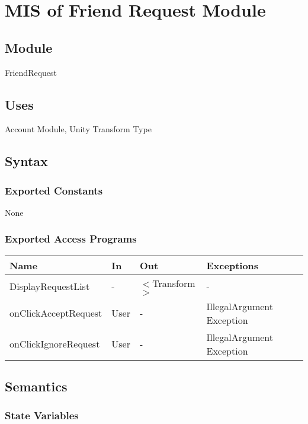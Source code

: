 \documentclass[12pt, titlepage]{article}
\begin{document}
\section{MIS of Friend Request Module} \label{mFR}

\subsection{Module}

FriendRequest

\subsection{Uses}

Account Module, Unity Transform Type

\subsection{Syntax}

\subsubsection{Exported Constants}
None

\subsubsection{Exported Access Programs}
\begin{center}
\begin{tabular}{p{4cm} p{2cm} p{4cm} p{4cm}}
\hline
\textbf{Name} & \textbf{In} & \textbf{Out} & \textbf{Exceptions} \\
\hline
DisplayRequestList & - & $<$Transform$>$ & -\\
onClickAcceptRequest & User & - & IllegalArgument Exception \\
onClickIgnoreRequest & User & - & IllegalArgument Exception\\
\hline
\end{tabular}
\end{center}

\subsection{Semantics}

\subsubsection{State Variables}
\end{document}
